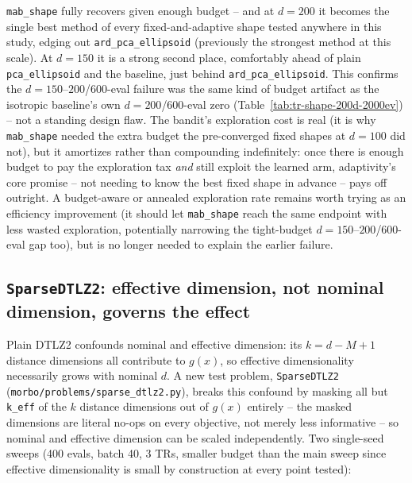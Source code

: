 \documentclass[11pt]{article}
\begin{document}
\texttt{mab\_shape} fully recovers given enough budget -- and at $d{=}200$
it becomes the single best method of every fixed-and-adaptive shape tested
anywhere in this study, edging out \texttt{ard\_pca\_ellipsoid} (previously
the strongest method at this scale). At $d{=}150$ it is a strong second
place, comfortably ahead of plain \texttt{pca\_ellipsoid} and the baseline,
just behind \texttt{ard\_pca\_ellipsoid}. This confirms the
$d{=}150$--$200$/600-eval failure was the same kind of budget artifact as
the isotropic baseline's own $d{=}200$/600-eval zero (Table~\ref{tab:tr-shape-200d-2000ev})
-- not a standing design flaw. The bandit's exploration cost is real (it is
why \texttt{mab\_shape} needed the extra budget the pre-converged fixed
shapes at $d{=}100$ did not), but it amortizes rather than compounding
indefinitely: once there is enough budget to pay the exploration tax
\emph{and} still exploit the learned arm, adaptivity's core promise -- not
needing to know the best fixed shape in advance -- pays off outright. A
budget-aware or annealed exploration rate remains worth trying as an
efficiency improvement (it should let \texttt{mab\_shape} reach the same
endpoint with less wasted exploration, potentially narrowing the
tight-budget $d{=}150$--$200$/600-eval gap too), but is no longer needed to
explain the earlier failure.

\subsection{\texttt{SparseDTLZ2}: effective dimension, not nominal dimension, governs the effect}
\label{sec:sparse-dtlz2}

Plain DTLZ2 confounds nominal and effective dimension: its
$k = d - M + 1$ distance dimensions all contribute to $g(x)$, so effective
dimensionality necessarily grows with nominal $d$. A new test problem,
\texttt{SparseDTLZ2} (\texttt{morbo/problems/sparse\_dtlz2.py}), breaks
this confound by masking all but \texttt{k\_eff} of the $k$ distance
dimensions out of $g(x)$ entirely -- the masked dimensions are literal
no-ops on every objective, not merely less informative -- so nominal and
effective dimension can be scaled independently. Two single-seed sweeps
(400 evals, batch 40, 3 TRs, smaller budget than the main sweep since
effective dimensionality is small by construction at every point tested):
\end{document}
